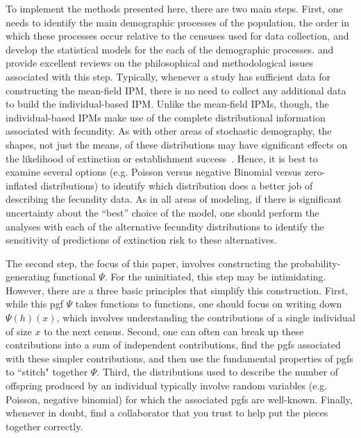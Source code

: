 \documentclass[12pt]{amsart}\usepackage[]{graphicx}\usepackage[]{color}
\begin{document}
To implement the methods presented here, there are two main steps. First, one needs to identify the main demographic processes of the population, the order in which these processes occur relative to the censuses used for data collection, and develop the statistical models for the each of the demographic processes. \citet{rees-etal-14} and \citet{merow-etal-14} provide excellent reviews on the philosophical and methodological issues associated with this step. Typically, whenever a study has sufficient data for constructing the mean-field IPM, there is no need to collect any additional data to build the individual-based IPM.  Unlike the mean-field IPMs, though, the individual-based IPMs make use of the complete distributional information associated with fecundity. As with other areas of stochastic demography, the shapes, not just the means, of these distributions may have significant effects on the likelihood of extinction or establishment success~\citep{nature-05}. Hence, it is best to examine several options (e.g. Poisson versus negative Binomial versus zero-inflated distributions) to identify which distribution does a better job of describing the fecundity data. As in all areas of modeling, if there is significant uncertainty about the ``best'' choice of the model, one should perform the analyses with each of the alternative fecundity distributions to identify the sensitivity of predictions of extinction risk to these alternatives.

The second step, the focus of this paper, involves constructing the probability-generating functional $\Psi$. For the uninitiated, this step may be intimidating. However, there are a three basic principles that simplify this construction. First, while this pgf $\Psi$ takes functions to functions, one should focus on writing down $\Psi(h)(x)$, which involves understanding the contributions of a single individual of size $x$ to the next census. Second, one can often can break up these contributions into a sum of independent contributions, find the pgfs associated with these simpler contributions, and then use the fundamental properties of pgfs to ``stitch" together $\Psi$. Third, the distributions used to describe the number of offspring produced by an individual typically involve random variables (e.g. Poisson, negative binomial) for which the associated pgfs are well-known. Finally, whenever in doubt, find a collaborator that you trust to help put the pieces together correctly.
\end{document}
